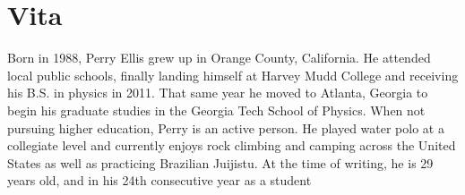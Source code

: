 \chapter*{Vita}
Born in 1988, Perry Ellis grew up in Orange County, California.
He attended local public schools, finally landing himself at Harvey Mudd College and receiving his B.S. in physics in 2011.
That same year he moved to Atlanta, Georgia to begin his graduate studies in the Georgia Tech School of Physics.
When not pursuing higher education, Perry is an active person.
He played water polo at a collegiate level and currently enjoys rock climbing and camping across the United States as well as practicing Brazilian Juijistu.
At the time of writing, he is 29 years old, and in his 24th consecutive year as a student
